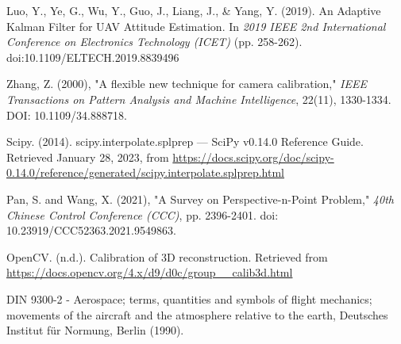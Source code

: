\begin{flushleft}
\begin{thebibliography}{19}
 Luo, Y., Ye, G., Wu, Y., Guo, J., Liang, J., \& Yang, Y. (2019). An Adaptive Kalman Filter for UAV Attitude Estimation. In \textit{2019 IEEE 2nd International Conference on Electronics Technology (ICET)} (pp. 258-262). doi:10.1109/ELTECH.2019.8839496


Zhang, Z. (2000), "A flexible new technique for camera calibration," \textit{IEEE Transactions on Pattern Analysis and Machine Intelligence}, 22(11), 1330-1334. DOI: 10.1109/34.888718.





Scipy. (2014). scipy.interpolate.splprep — SciPy v0.14.0 Reference Guide. Retrieved January 28, 2023, from \url{https://docs.scipy.org/doc/scipy-0.14.0/reference/generated/scipy.interpolate.splprep.html}


 Pan, S. and Wang, X. (2021), "A Survey on Perspective-n-Point Problem," \textit{40th Chinese Control Conference (CCC)}, pp. 2396-2401. doi: 10.23919/CCC52363.2021.9549863.

 OpenCV. (n.d.). Calibration of 3D reconstruction. Retrieved from \url{https://docs.opencv.org/4.x/d9/d0c/group__calib3d.html}


 DIN 9300-2 - Aerospace; terms, quantities and symbols of flight mechanics; movements of the aircraft and the atmosphere relative to the earth, Deutsches Institut für Normung, Berlin (1990).








\end{thebibliography}
\end{flushleft}
